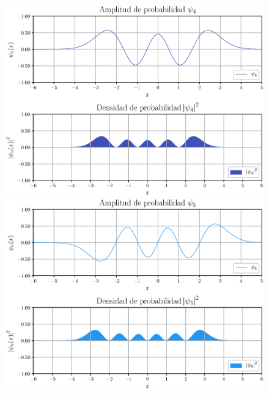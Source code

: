\begin{figure}[H]
    \centering
    \includegraphics[scale=0.6]{Imagenes/Funcion_Onda_04.eps}
    \includegraphics[scale=0.6]{Imagenes/Funcion_Onda_05.eps}
\end{figure}
